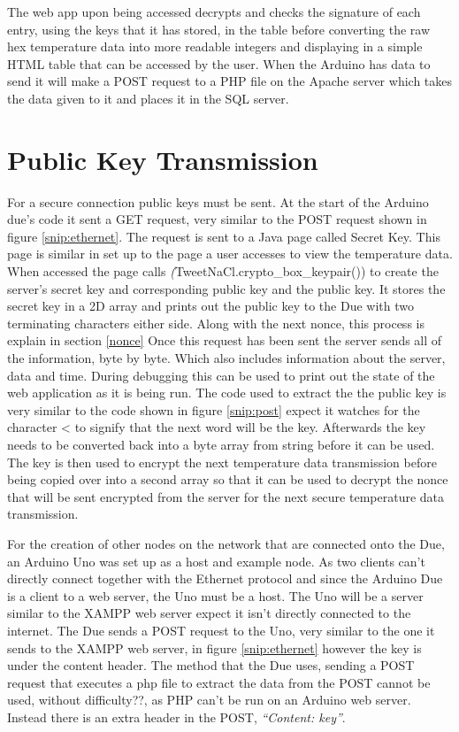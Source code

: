 The web app upon being accessed decrypts and checks the signature of each entry, using the keys that it has stored, in the table before converting the raw hex temperature data into more readable integers and displaying in a simple HTML table that can be accessed by the user. When the Arduino has data to send it will make a POST request to a PHP file on the Apache server which takes the data given to it and places it in the SQL server.

\section{Public Key Transmission}
\label{pktransmit}

For a secure connection public keys must be sent. At the start of the Arduino due's code it sent a GET request, very similar to the POST request shown in figure \ref{snip:ethernet}. The request is sent to a Java page called Secret Key. This page is similar in set up to the page a user accesses to view the temperature data. When accessed the page calls \emph(TweetNaCl.crypto\_box\_keypair()) to create the server's secret key and corresponding public key and the public key. It stores the secret key in a 2D array and prints out the public key to the Due with two terminating characters either side. Along with the next nonce, this process is explain in section \ref{nonce} Once this request has been sent the server sends all of the information, byte by byte. Which also includes information about the server, data and time. During debugging this can be used to print out the state of the web application as it is being run. The code used to extract the the public key is very similar to the code shown in figure \ref{snip:post} expect it watches for the character < to signify that the next word will be the key. Afterwards the key needs to be converted back into a byte array from string before it can be used. The key is then used to encrypt the next temperature data transmission before being copied over into a second array so that it can be used to decrypt the nonce that will be sent encrypted from the server for the next secure temperature data transmission. 

For the creation of other nodes on the network that are connected onto the Due, an Arduino Uno was set up as a host and example node. As two clients can't directly connect together with the Ethernet protocol and since the Arduino Due is a client to a web server, the Uno must be a host. The Uno will be a server similar to the XAMPP web server expect it isn't directly connected to the internet. 
The Due sends a POST request to the Uno, very similar to the one it sends to the XAMPP web server, in figure \ref{snip:ethernet} however the key is under the content header. The method that the Due uses, sending a POST request that executes a php file to extract the data from the POST cannot be used, without difficulty??, as PHP can't be run on an Arduino web server. Instead there is an extra header in the POST, \emph{``Content: key''}.

